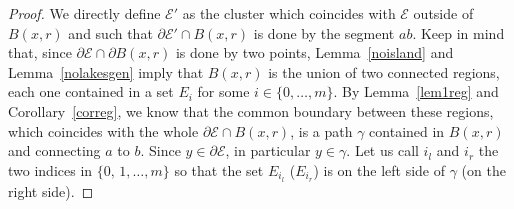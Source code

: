 \documentclass[10pt]{amsart}
\newcommand\E{\mathcal{E}}
\theoremstyle{plain}
\theoremstyle{definition}
\begin{document}
\begin{proof}
We directly define $\E'$ as the cluster which coincides with $\E$ outside of $B(x,r)$ and such that $\partial\E'\cap B(x,r)$ is done by the segment $ab$. Keep in mind that, since $\partial\E\cap \partial B(x,r)$ is done by two points, Lemma~\ref{noisland} and Lemma~\ref{nolakesgen} imply that $B(x,r)$ is the union of two connected regions, each one contained in a set $E_i$ for some $i\in\{0,\dots,m\}$. By Lemma~\ref{lem1reg} and Corollary~\ref{correg}, we know that the common boundary between these regions, which coincides with the whole $\partial\E\cap B(x,r)$, is a path $\gamma$ contained in $B(x,r)$ and connecting $a$ to $b$. Since $y\in\partial\E$, in particular $y\in\gamma$. Let us call $i_l$ and $i_r$ the two indices in $\{0,\, 1 ,\dots, m\}$ so that the set $E_{i_l}$ (\resp $E_{i_r}$) is on the left side of $\gamma$ (\resp on the right side).


\end{proof}
\end{document}
